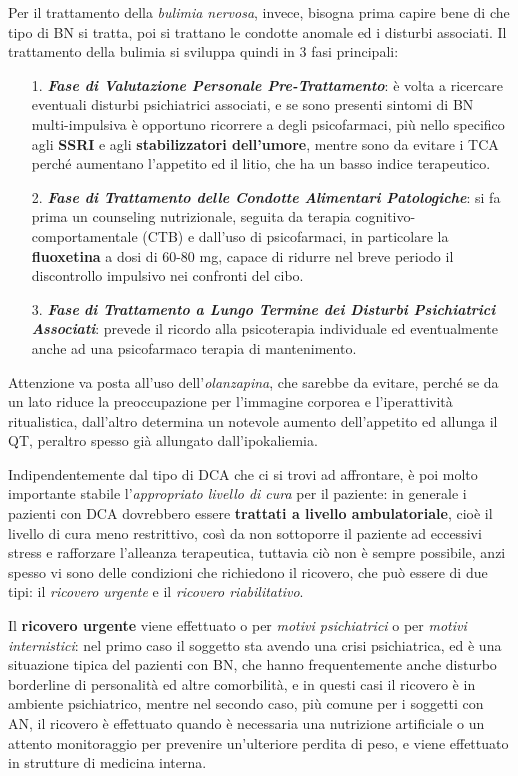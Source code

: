 Per il trattamento della \emph{bulimia nervosa}, invece, bisogna prima
capire bene di che tipo di BN si tratta, poi si trattano le condotte
anomale ed i disturbi associati. Il trattamento della bulimia si
sviluppa quindi in 3 fasi principali:

\begin{itemize}
\item[1.]
  \textbf{\emph{Fase di Valutazione Personale Pre-Trattamento}}: è volta
  a ricercare eventuali disturbi psichiatrici associati, e se sono
  presenti sintomi di BN multi-impulsiva è opportuno ricorrere a degli
  psicofarmaci, più nello specifico agli \textbf{SSRI} e agli
  \textbf{stabilizzatori dell'umore}, mentre sono da evitare i TCA
  perché aumentano l'appetito ed il litio, che ha un basso indice
  terapeutico.
\item[2.]
  \textbf{\emph{Fase di Trattamento delle Condotte Alimentari
  Patologiche}}: si fa prima un counseling nutrizionale, seguita da
  terapia cognitivo-comportamentale (CTB) e dall'uso di psicofarmaci, in
  particolare la \textbf{fluoxetina} a dosi di 60-80 mg, capace di
  ridurre nel breve periodo il discontrollo impulsivo nei confronti del
  cibo.
\item[3.]
  \emph{\textbf{Fase} \textbf{di Trattamento a Lungo Termine dei
  Disturbi Psichiatrici Associati}}: prevede il ricordo alla
  psicoterapia individuale ed eventualmente anche ad una psicofarmaco
  terapia di mantenimento.
\end{itemize}

Attenzione va posta all'uso dell'\emph{olanzapina}, che sarebbe da
evitare, perché se da un lato riduce la preoccupazione per l'immagine
corporea e l'iperattività ritualistica, dall'altro determina un notevole
aumento dell'appetito ed allunga il QT, peraltro spesso già allungato
dall'ipokaliemia.

Indipendentemente dal tipo di DCA che ci si trovi ad affrontare, è poi
molto importante stabile l'\emph{appropriato livello di cura} per il
paziente: in generale i pazienti con DCA dovrebbero essere
\textbf{trattati a livello ambulatoriale}, cioè il livello di cura meno
restrittivo, così da non sottoporre il paziente ad eccessivi stress e
rafforzare l'alleanza terapeutica, tuttavia ciò non è sempre possibile,
anzi spesso vi sono delle condizioni che richiedono il ricovero, che può
essere di due tipi: il \emph{ricovero urgente} e il \emph{ricovero
riabilitativo}.

Il \textbf{ricovero urgente} viene effettuato o per \emph{motivi
psichiatrici} o per \emph{motivi internistici}: nel primo caso il
soggetto sta avendo una crisi psichiatrica, ed è una situazione tipica
del pazienti con BN, che hanno frequentemente anche disturbo borderline
di personalità ed altre comorbilità, e in questi casi il ricovero è in
ambiente psichiatrico, mentre nel secondo caso, più comune per i
soggetti con AN, il ricovero è effettuato quando è necessaria una
nutrizione artificiale o un attento monitoraggio per prevenire
un'ulteriore perdita di peso, e viene effettuato in strutture di
medicina interna.


